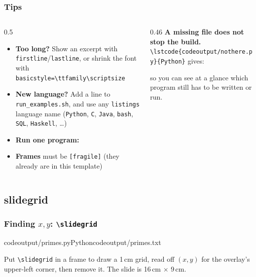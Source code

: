 \documentclass[aspectratio=169,10pt,compress]{beamer}
\begin{document}
\begin{frame}[t,fragile] \frametitle{Tips}
  \begin{columns}[T]
    \begin{column}{0.5\textwidth}
      \begin{itemize}\small
        \item \textbf{Too long?} Show an excerpt with \texttt{firstline}/\texttt{lastline},
              or shrink the font with \texttt{basicstyle=\textbackslash ttfamily\textbackslash scriptsize}
        \item \textbf{New language?} Add a line to \texttt{run\_examples.sh}, and use any
              \texttt{listings} language name (\texttt{Python}, \texttt{C}, \texttt{Java},
              \texttt{bash}, \texttt{SQL}, \texttt{Haskell}, \dots)
        \item \textbf{Run one program:} 
        \item \textbf{Frames} must be \texttt{[fragile]} (they already are in this template)
      \end{itemize}
    \end{column}
    \begin{column}{0.46\textwidth}
      \small \textbf{A missing file does not stop the build.}
      \verb|\lstcode{codeoutput/nothere.py}{Python}| gives:
      \vspace{0.3em}


      \small so you can see at a glance which program still has to be written or run.
    \end{column}
  \end{columns}
\end{frame}




\subsection[slidegrid]{slidegrid}




\begin{frame}[t,fragile] \frametitle{Finding $x,y$: \texttt{\textbackslash slidegrid}}
  \slidegrid
  \lstcodeoverlaystep[basicstyle=\ttfamily\scriptsize][][0.4\textwidth]{8.9cm,2.1cm}%
    {codeoutput/primes.py}{Python}{codeoutput/primes.txt}

  \small Put \verb|\slidegrid| in a frame to draw a 1\,cm grid, read off $(x,y)$ for the
  overlay's upper-left corner, then remove it. The slide is 16\,cm $\times$ 9\,cm.
\end{frame}
\end{document}
